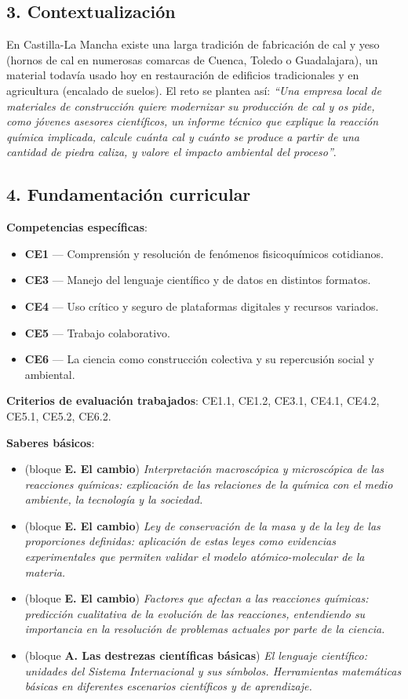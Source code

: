\documentclass[11pt,a4paper]{article}
\begin{document}
\subsection*{3. Contextualización}
En Castilla-La Mancha existe una larga tradición de fabricación de cal y yeso (hornos de cal en numerosas comarcas de Cuenca, Toledo o Guadalajara), un material todavía usado hoy en restauración de edificios tradicionales y en agricultura (encalado de suelos). El reto se plantea así: \textit{``Una empresa local de materiales de construcción quiere modernizar su producción de cal y os pide, como jóvenes asesores científicos, un informe técnico que explique la reacción química implicada, calcule cuánta cal y cuánto  se produce a partir de una cantidad de piedra caliza, y valore el impacto ambiental del proceso''}.

\subsection*{4. Fundamentación curricular}
\textbf{Competencias específicas}:
\begin{itemize}
    \item \textbf{CE1} --- Comprensión y resolución de fenómenos fisicoquímicos cotidianos.
    \item \textbf{CE3} --- Manejo del lenguaje científico y de datos en distintos formatos.
    \item \textbf{CE4} --- Uso crítico y seguro de plataformas digitales y recursos variados.
    \item \textbf{CE5} --- Trabajo colaborativo.
    \item \textbf{CE6} --- La ciencia como construcción colectiva y su repercusión social y ambiental.
\end{itemize}

\textbf{Criterios de evaluación trabajados}: CE1.1, CE1.2, CE3.1, CE4.1, CE4.2, CE5.1, CE5.2, CE6.2.

\textbf{Saberes básicos}:
\begin{itemize}
    \item (bloque \textbf{E. El cambio}) \textit{Interpretación macroscópica y microscópica de las reacciones químicas: explicación de las relaciones de la química con el medio ambiente, la tecnología y la sociedad.}
    \item (bloque \textbf{E. El cambio}) \textit{Ley de conservación de la masa y de la ley de las proporciones definidas: aplicación de estas leyes como evidencias experimentales que permiten validar el modelo atómico-molecular de la materia.}
    \item (bloque \textbf{E. El cambio}) \textit{Factores que afectan a las reacciones químicas: predicción cualitativa de la evolución de las reacciones, entendiendo su importancia en la resolución de problemas actuales por parte de la ciencia.}
    \item (bloque \textbf{A. Las destrezas científicas básicas}) \textit{El lenguaje científico: unidades del Sistema Internacional y sus símbolos. Herramientas matemáticas básicas en diferentes escenarios científicos y de aprendizaje.}
\end{itemize}
\end{document}
